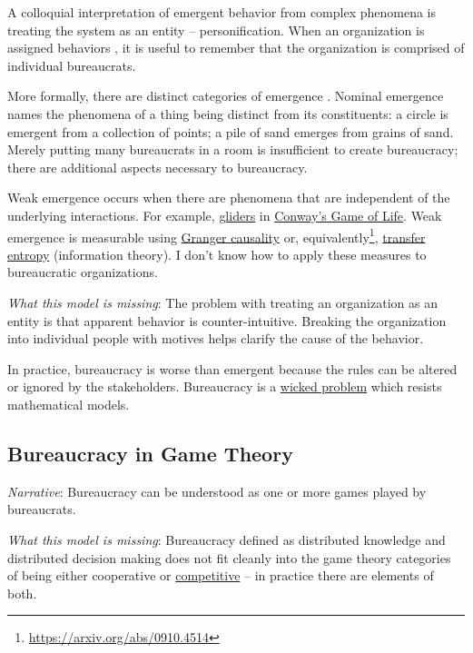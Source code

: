 A colloquial interpretation of emergent behavior from complex phenomena is treating the system as an entity -- personification. When an organization is assigned behaviors \cite{2002_Gall}, it is useful to remember that the organization is comprised of individual bureaucrats. 


More formally, there are distinct categories of emergence \cite{2002_Bedau}. Nominal emergence names the phenomena of a thing being distinct from its constituents: a circle is emergent from a collection of points; a pile of sand emerges from grains of sand. Merely putting many bureaucrats in a room is insufficient to create bureaucracy; there are additional aspects necessary to bureaucracy. 

Weak emergence occurs when there are phenomena that are independent of the underlying interactions. For example, \href{https://en.wikipedia.org/wiki/Glider_(Conway\%27s_Life)}{gliders} in \href{https://en.wikipedia.org/wiki/Conway\%27s_Game_of_Life}{Conway's Game of Life}.
Weak emergence is measurable using \href{https://en.wikipedia.org/wiki/Granger_causality}{Granger causality} or, equivalently\footnote{\href{https://arxiv.org/abs/0910.4514}{https://arxiv.org/abs/0910.4514}}, \href{https://en.wikipedia.org/wiki/Transfer_entropy}{transfer entropy} (information theory). I don't know how to apply these measures to bureaucratic organizations. 

\textit{What this model is missing}: The problem with treating an organization as an entity is that apparent behavior is counter-intuitive. Breaking the organization into individual people with motives helps clarify the cause of the behavior. 

In practice, bureaucracy is worse than emergent because the rules can be altered or ignored by the stakeholders. Bureaucracy is a \href{https://en.wikipedia.org/wiki/Wicked_problem}{wicked problem} which resists mathematical models. 

\subsection*{Bureaucracy in Game Theory}
\textit{Narrative}: Bureaucracy can be understood as one or more games played by bureaucrats. 

\textit{What this model is missing}: Bureaucracy defined as distributed knowledge and distributed decision making does not fit cleanly into the game theory categories of being either cooperative or \href{https://en.wikipedia.org/wiki/Non-cooperative_game_theory}{competitive} -- in practice there are elements of both. 

